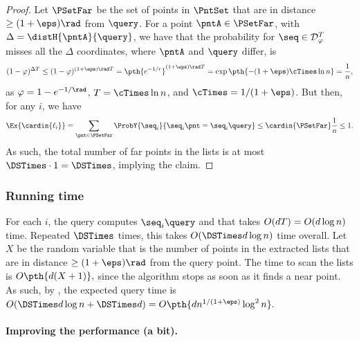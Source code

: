 \begin{proof}
    Let $\PSetFar$ be the set of points in $\PntSet$ that are in
    distance $\geq (1+\eps)\rad$ from $\query$.  For a point
    $\pntA \in \PSetFar$, with $\Delta = \distH{\pntA}{ \query}$, we
    have that the probability for $\seq \in \DistD{\pr}^\tTimes$
    misses all the $\Delta$ coordinates, where $\pntA$ and $\query$
    differ, is
    \begin{equation*}
        (1-\pr)^{\Delta \tTimes}%
        \leq 
        (1-\pr)^{(1+\eps)\rad \tTimes}%
        =%
        \pth{e^{-1/r}}^{(1+\eps)\rad \tTimes}%
      =%
      \exp\pth{ -(1+\eps) \cTimes \ln n }%
      =%
      \frac{1}{n},
    \end{equation*}
    as $\pr = 1-e^{-1/\rad}$, $\tTimes = \cTimes \ln n$, and
    $\cTimes = 1/(1+\eps)$. But then, for any $i$, we have
    \begin{equation*}
        \Ex{\bigl.\cardin{\ell_i}}%
        =%
        \sum_{\pnt \in \PSetFar}
        \ProbY{\bigl.\seq_i}{\seq_i \pnt = \seq_i \query }
        \leq%
        \cardin{\PSetFar} \frac{1}{n}
        \leq%
        1.
  \end{equation*}
    As such, the total number of far points in the lists is at most
    $\DSTimes \cdot 1 = \DSTimes$, implying the claim.
\end{proof}

\subsubsection{Running time}

For each $i$, the query computes $\seq_i \query$ and that takes
$O(d T) = O(d\log n)$ time. Repeated $\DSTimes$ times, this takes
$O( \DSTimes d \log n)$ time overall.  Let $X$ be the random variable
that is the number of points in the extracted lists that are in
distance $\geq (1+\eps)\rad$ from the query point.  The time to scan
the lists is
\begin{math}
    O\pth{\bigl. d( X +1) },
\end{math}
since the algorithm stops as soon as it finds a near point. As such,
by , the expected query time is
\begin{math}
    O( \DSTimes d \log n + \DSTimes d) = O\pth{d n^{1/(1+\eps)} \log^2
       n}.
\end{math}



\paragraph{Improving the performance (a bit).}

